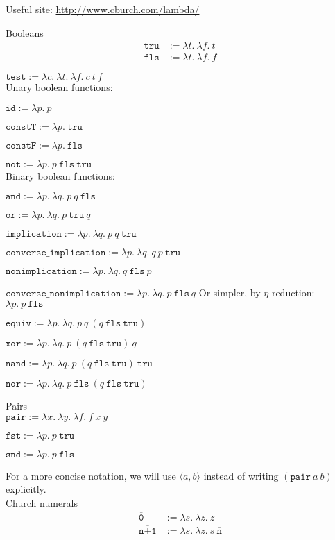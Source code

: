 \documentclass{article}
\theoremstyle{definition}
\newcommand{\fls}{\texttt{fls}\xspace}
\newcommand{\tru}{\texttt{tru}\xspace}
\renewcommand{\and}{\texttt{and}}
\renewcommand{\l}[1]{\lambda #1.~}
\newcommand{\pair}[1]{\langle #1 \rangle}
\newcommand{\num}[1]{\overline{\texttt{#1}}}
\begin{document}
Useful site: \url{http://www.cburch.com/lambda/}

Booleans
\begin{align*}
  \tru &:= \l{t} \l{f} t \\
  \fls &:= \l{t} \l{f} f
\end{align*}

\(\mathtt{test} := \l{c} \l{t} \l{f} c~t~f \)
\\[.1cm]

Unary boolean functions:

\(\texttt{id} := \l{p} p\)

\(\texttt{constT} := \l{p} \tru\)

\(\texttt{constF} := \l{p} \fls\)

\(\mathtt{not} := \l{p} p~\fls~\tru\)
\\[.1cm]

Binary boolean functions:

\(\and := \l{p} \l{q} p~q~\fls \)

\(\mathtt{or} := \l{p} \l{q} p~\tru~q \)

\(\texttt{implication} := \l{p} \l{q} p~q~\tru\)

\(\texttt{converse\_implication} := \l{p} \l{q} q~p~\tru\)

\(\texttt{nonimplication} := \l{p} \l{q} q~\fls~p\)

\(\texttt{converse\_nonimplication} := \l{p} \l{q} p~\fls~q\)
Or simpler, by \(\eta\)-reduction: \(\l{p} p~\fls\)

\(\texttt{equiv} := \l{p} \l{q} p~q~(q~\fls~\tru)\)

\(\texttt{xor} := \l{p} \l{q} p~(q~\fls~\tru)~q\)

\(\texttt{nand} := \l{p} \l{q} p~(q~\fls~\tru)~\tru\)

\(\texttt{nor} := \l{p} \l{q} p~\fls~(q~\fls~\tru)\)
\\[.1cm]

\newpage

Pairs\\

\(\texttt{pair} := \l{x} \l{y} \l{f} f~x~y\)

\(\texttt{fst} := \l{p} p~\tru\)

\(\texttt{snd} := \l{p} p~\fls\)

For a more concise notation, we will use \(\pair{a, b}\) instead of writing
\((\texttt{pair}~a~b)\) explicitly.\\

Church numerals
\begin{align*}
  \num{0} &:= \l{s} \l{z} z \\
  \num{n+1} &:= \l{s} \l{z} s~\num{n}
\end{align*}
\end{document}
